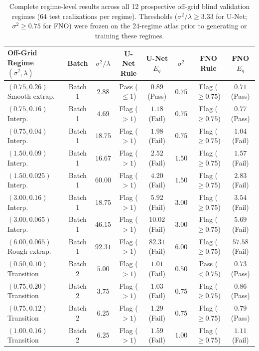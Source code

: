 \documentclass[preprint,12pt,authoryear]{elsarticle}
\begin{document}
\begin{table}[h!]
\centering
\caption{Complete regime-level results across all 12 prospective off-grid blind validation regimes ($64$ test realizations per regime). Thresholds ($\sigma^2/\lambda \ge 3.33$ for U-Net; $\sigma^2 \ge 0.75$ for FNO) were frozen on the 24-regime atlas prior to generating or training these regimes.}
\label{tab:s1_blind}
\footnotesize
\begin{tabular}{lccccccc}
\toprule
\textbf{Off-Grid Regime $(\sigma^2, \lambda)$} & \textbf{Batch} & \textbf{$\sigma^2/\lambda$} & \textbf{U-Net Rule} & \textbf{U-Net $E_q$} & \textbf{$\sigma^2$} & \textbf{FNO Rule} & \textbf{FNO $E_q$} \\
\midrule
$(0.75, 0.26)$ Smooth extrap. & Batch 1 & $2.88$ & Pass ($\le 1$) & $0.89$ (Pass) & $0.75$ & Flag ($\ge 0.75$) & $0.71$ (Pass) \\
$(0.75, 0.16)$ Interp.        & Batch 1 & $4.69$ & Flag ($> 1$)   & $1.18$ (Fail) & $0.75$ & Flag ($\ge 0.75$) & $0.77$ (Pass) \\
$(0.75, 0.04)$ Interp.        & Batch 1 & $18.75$ & Flag ($> 1$)  & $1.98$ (Fail) & $0.75$ & Flag ($\ge 0.75$) & $1.04$ (Fail) \\
$(1.50, 0.09)$ Interp.        & Batch 1 & $16.67$ & Flag ($> 1$)  & $2.52$ (Fail) & $1.50$ & Flag ($\ge 0.75$) & $1.57$ (Fail) \\
$(1.50, 0.025)$ Interp.       & Batch 1 & $60.00$ & Flag ($> 1$)  & $4.20$ (Fail) & $1.50$ & Flag ($\ge 0.75$) & $2.83$ (Fail) \\
$(3.00, 0.16)$ Interp.        & Batch 1 & $18.75$ & Flag ($> 1$)  & $5.92$ (Fail) & $3.00$ & Flag ($\ge 0.75$) & $3.54$ (Fail) \\
$(3.00, 0.065)$ Interp.       & Batch 1 & $46.15$ & Flag ($> 1$)  & $10.02$ (Fail) & $3.00$ & Flag ($\ge 0.75$) & $5.69$ (Fail) \\
$(6.00, 0.065)$ Rough extrap. & Batch 1 & $92.31$ & Flag ($> 1$)  & $82.31$ (Fail) & $6.00$ & Flag ($\ge 0.75$) & $57.58$ (Fail) \\
$(0.50, 0.10)$ Transition     & Batch 2 & $5.00$  & Flag ($> 1$)  & $1.01$ (Fail) & $0.50$ & Pass ($< 0.75$)   & $0.73$ (Pass) \\
$(0.75, 0.20)$ Transition     & Batch 2 & $3.75$  & Flag ($> 1$)  & $1.03$ (Fail) & $0.75$ & Flag ($\ge 0.75$) & $0.86$ (Pass) \\
$(0.75, 0.12)$ Transition     & Batch 2 & $6.25$  & Flag ($> 1$)  & $1.29$ (Fail) & $0.75$ & Flag ($\ge 0.75$) & $0.79$ (Pass) \\
$(1.00, 0.16)$ Transition     & Batch 2 & $6.25$  & Flag ($> 1$)  & $1.59$ (Fail) & $1.00$ & Flag ($\ge 0.75$) & $1.11$ (Fail) \\
\bottomrule
\end{tabular}
\end{table}
\end{document}
